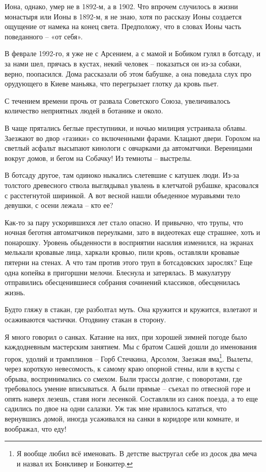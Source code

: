 Иона, однако, умер не в 1892-м, а в 1902. Что впрочем случилось в жизни монастыря или Ионы в 1892-м, я не знаю, хотя по рассказу Ионы создается ощущение от намека на конец света. Предположу, что в словах Ионы часть поведанного – «от себя».

В феврале 1992-го, я уже не с Арсением, а с мамой и Бобиком гулял в ботсаду, и за нами шел, прячась в кустах, некий человек – показаться он из-за собаки, верно, поопасился. Дома рассказали об этом бабушке, а она поведала слух про орудующего в Киеве маньяка, что перегрызает глотку да кровь пьет.

С течением времени прочь от развала Советского Союза, увеличивалось количество неприятных людей в ботанике и около. 

В чаще прятались беглые преступники, и ночью милиция устраивала облавы. Заезжают во двор «газики» со включенными фарами. Клацают двери. Горохом на светлый асфальт высыпают кинологи с овчарками да автоматчики. Вереницами вокруг домов, и бегом на Собачку! Из темноты – выстрелы. 

В ботсаду другое, там одиноко ныкались слетевшие с катушек люди. Из-за толстого древесного ствола выглядывал увалень в клетчатой рубашке, красовался с расстегнутой ширинкой. А вот весной нашли объеденное муравьями тело девушки, с осени лежала – кто ее?

Как-то за пару ускорившихся лет стало опасно. И привычно, что трупы, что ночная беготня автоматчиков переулками, зато в видеотеках еще страшнее, хоть и понарошку. Уровень обыденности в восприятии насилия изменился, на экранах мелькали кровавые лица, харкали кровью, пили кровь, оставляли кровавые пятерни на стенах. А что там против этого труп в ботсадовских зарослях? Еще одна копейка в пригоршни мелочи. Блеснула и затерялась. В макулатуру отправились обесценившиеся собрания сочинений классиков, обесценилась жизнь. 

Будто гляжу в стакан, где разболтал муть. Она кружится и кружится, взлетают и осаживаются частички. Отодвину стакан в сторону.

Я много говорил о санках. Катание на них, при хорошей зимней погоде было каждодневным мастерским занятием. Мы с братом Сашей дошли до именования горок, удолий и трамплинов – Горб Стечкина, Арсолом, Заезжая яма\footnote{Я вообще любил всё именовать. В детстве выстругал себе из досок два меча и назвал их Бонкливер и Бонкитер.}. Вылеты, через короткую невесомость, к самому краю опорной стены, или в кусты с обрыва, воспринимались со смехом. Были трассы долгие, с поворотами, где требовалось умение вписываться. А были прямые – съехал по отвесной горе и опять наверх лезешь, ставя ноги лесенкой. Составляли из санок поезда, а то еще садились по двое на одни салазки. Уж так мне нравилось кататься, что вернувшись домой, иногда усаживался на санки в коридоре или комнате, и воображал, что еду!

